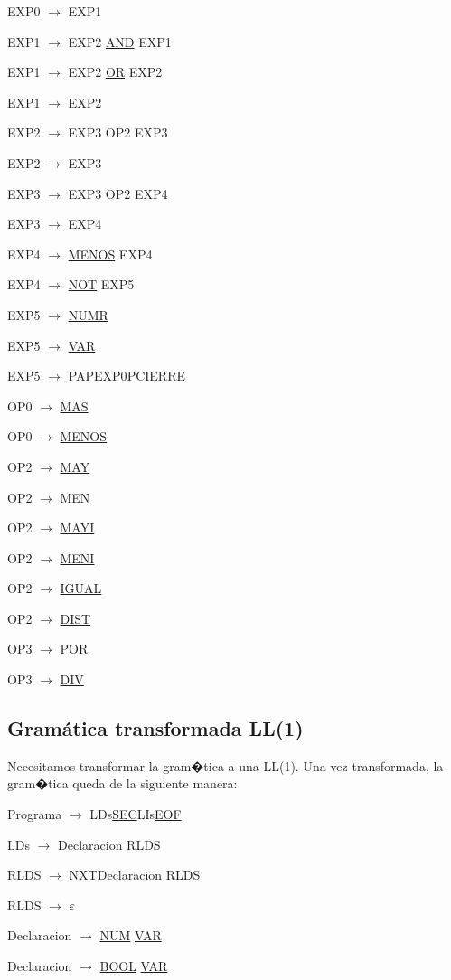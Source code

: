 \documentclass[11pt,oneside,onecolumn,openany,spanish]{book}
\begin{document}
EXP0 $\rightarrow$ EXP1 

EXP1 $\rightarrow$ EXP2 \underline{AND} EXP1 

EXP1 $\rightarrow$ EXP2 \underline{OR} EXP2  

EXP1 $\rightarrow$ EXP2

EXP2 $\rightarrow$ EXP3 OP2 EXP3 

EXP2 $\rightarrow$ EXP3 

EXP3 $\rightarrow$ EXP3 OP2 EXP4 

EXP3 $\rightarrow$ EXP4 

EXP4 $\rightarrow$ \underline{MENOS} EXP4

EXP4 $\rightarrow$ \underline{NOT} EXP5 

EXP5 $\rightarrow$ \underline{NUMR}

EXP5 $\rightarrow$ \underline{VAR}

EXP5 $\rightarrow$ \underline{PAP}EXP0\underline{PCIERRE} 

OP0 $\rightarrow$ \underline{MAS}

OP0 $\rightarrow$ \underline{MENOS} 

OP2 $\rightarrow$ \underline{MAY} 

OP2 $\rightarrow$ \underline{MEN} 

OP2 $\rightarrow$ \underline{MAYI} 

OP2 $\rightarrow$ \underline{MENI} 

OP2 $\rightarrow$ \underline{IGUAL} 

OP2 $\rightarrow$ \underline{DIST} 

OP3 $\rightarrow$ \underline{POR} 

OP3 $\rightarrow$ \underline{DIV} 

\subsection{Gramática transformada LL(1)}
Necesitamos transformar la gram�tica a una LL(1). Una vez transformada, la gram�tica queda de la siguiente manera:

Programa $\rightarrow$ LDs\underline{SEC}LIs\underline{EOF}

LDs $\rightarrow$ Declaracion RLDS

RLDS $\rightarrow$ \underline{NXT}Declaracion RLDS

RLDS $\rightarrow$ $\varepsilon$

Declaracion $\rightarrow$ \underline{NUM} \underline{VAR}

Declaracion $\rightarrow$ \underline{BOOL} \underline{VAR}
\end{document}
